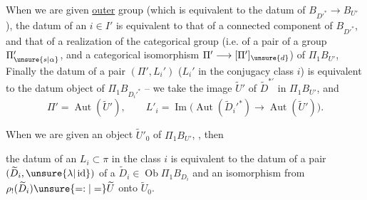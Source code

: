 When we are given   \uline{outer} group  (which  is equivalent to the datum of \(B_{D'^*}\longrightarrow B_{U'}\)), the datum of an  \(i\in I'\) is equivalent to that of a connected component of \(B_{D'^*}\), and that of a realization  of the categorical group (i.e. of a pair of a group \(\Pi'_{\unsure{s|\alpha}}\), and a categorical isomorphism \(\Pi'\longrightarrow[\Pi']_{\unsure{d}}\))   of \(\Pi_1B_{U'}\), Finally the datum of a pair \((\Pi',L_i')\) (\(L_i'\) in the conjugacy class \(i\)) is equivalent  to the datum  object  of \(\Pi_1B_{D_i'^*}\) -- we take the image \(\widetilde U'\) of \(\widetilde D^{*'}\) in \(\Pi_1B_{U'}\), and
\[
\Pi'=\operatorname{Aut}(\widetilde U'),\qquad
L'_i=\operatorname{Im}\bigl(\operatorname{Aut}(\widetilde D_i'^*)\longrightarrow
\operatorname{Aut}(\widetilde U')\bigr).
\]

When we are given   an object \(\widetilde U'_0\) of \(\Pi_1B_{U'}\),  , then


the datum of an \(L_i\subset\pi\) in the class \(i\) is equivalent to the datum of a pair \((\widetilde D_i,\unsure{\lambda|\operatorname{id}})\) of a \(\widetilde D_i\in\operatorname{Ob}\Pi_1B_{D_i}\) and an isomorphism from \(\rho_!(\widetilde D_i)\unsure{=:|=}\widetilde U\) onto \(\widetilde U_0\).

